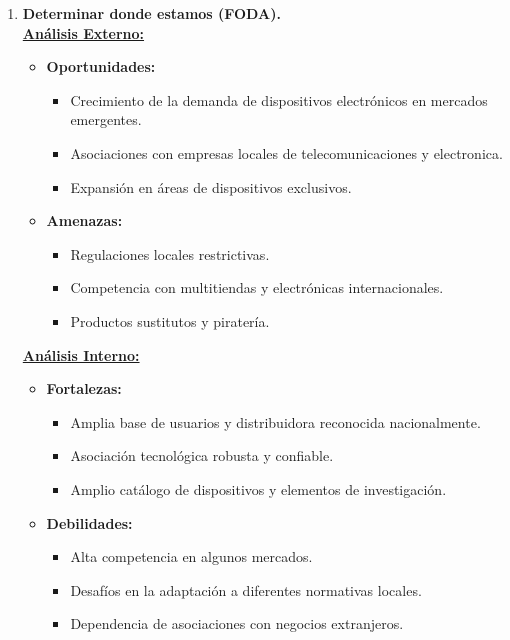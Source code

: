 \documentclass{templateNote}
\begin{document}
\begin{enumerate}[label=\alph*)]
    \item \textbf{Determinar donde estamos (FODA).} \\
    \underline{\textbf{Análisis Externo:}}
    \begin{itemize}
        \item \textbf{Oportunidades:}
        \begin{itemize}
            \item Crecimiento de la demanda de dispositivos electrónicos en mercados emergentes.
            \item Asociaciones con empresas locales de telecomunicaciones y electronica.
            \item Expansión en áreas de dispositivos exclusivos.
        \end{itemize}
        \item \textbf{Amenazas:} 
        \begin{itemize}
            \item Regulaciones locales restrictivas.
            \item Competencia con multitiendas y electrónicas internacionales.
            \item Productos sustitutos y piratería.
        \end{itemize}
    \end{itemize}
    \underline{\textbf{Análisis Interno:}}
    \begin{itemize}
        \item \textbf{Fortalezas:} 
        \begin{itemize}
            \item Amplia base de usuarios y distribuidora reconocida nacionalmente.
            \item Asociación tecnológica robusta y confiable.
            \item Amplio catálogo de dispositivos y elementos de investigación.
        \end{itemize}
        \item \textbf{Debilidades:}
        \begin{itemize}
            \item Alta competencia en algunos mercados.
            \item Desafíos en la adaptación a diferentes normativas locales.
            \item Dependencia de asociaciones con negocios extranjeros.
        \end{itemize}
    \end{itemize}


\end{enumerate}
\end{document}
